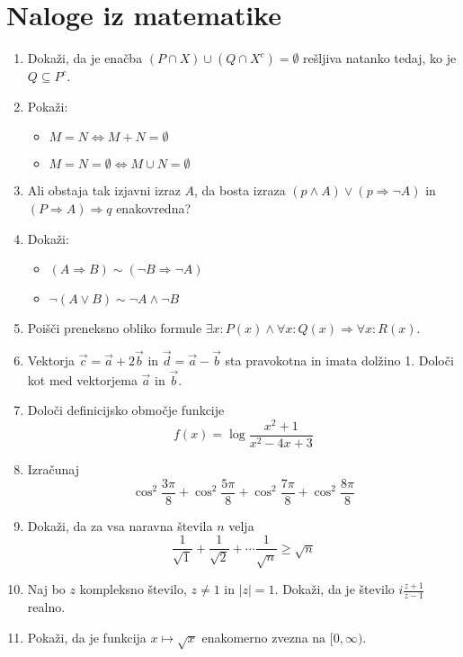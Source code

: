 \documentclass[a4paper,12pt]{article}
\begin{document}
\section*{Naloge iz matematike}
\begin{enumerate}
\item Dokaži, da je enačba $(P\cap X)\cup (Q\cap X^c) = \emptyset$
rešljiva natanko tedaj, ko je $Q\subseteq P^c$.

\item Pokaži:
\begin{itemize}
\item$M=N \iff M + N = \emptyset$
\item$M=N=\emptyset \iff M\cup N = \emptyset$
\end{itemize}
\item Ali obstaja tak izjavni izraz $A$, da bosta izraza
$(p\wedge A)\vee (p\Rightarrow \neg A)$  in $(P\Rightarrow A)\Rightarrow q$
enakovredna?

\item Dokaži:
\begin{itemize}
\item$(A\Rightarrow B)\sim (\neg B \Rightarrow \neg A)$
\item$\neg (A \vee B) \sim \neg A \wedge \neg B$
\end{itemize}
\item Poišči preneksno obliko formule $\exists x:P(x)\wedge \forall x:Q(x) \Rightarrow \forall x : R(x)$.

\item Vektorja $\vec{c} = \vec{a} + 2\vec{b}$ in $\vec{d} = \vec{a} - \vec{b}$
sta pravokotna in imata dolžino 1. Določi kot med vektorjema $\vec{a}$ in $\vec{b}$.

\item Določi definicijsko območje funkcije
$$f(x)=\log \frac{x^2+1}{x^2-4x+3}$$

\item Izračunaj
$$\cos^2 \frac{3\pi}{8} + \cos^2 \frac{5\pi}{8} + \cos^2 \frac{7\pi}{8} + \cos^2\frac{8\pi}{8}$$

\item Dokaži, da za vsa naravna števila $n$ velja
$$\frac{1}{\sqrt{1}} +\frac{1}{\sqrt{2}} +\cdots \frac{1}{\sqrt{n}} \ge \sqrt{n}$$

\item Naj bo $z$ kompleksno število, $z\ne 1$ in $|z| =1$.
Dokaži, da je število $i\frac{z+1}{z-1}$ realno.

\item Pokaži, da je funkcija $x\mapsto \sqrt{x}$ enakomerno zvezna na $[0,\infty )$.


\end{enumerate}
\end{document}
